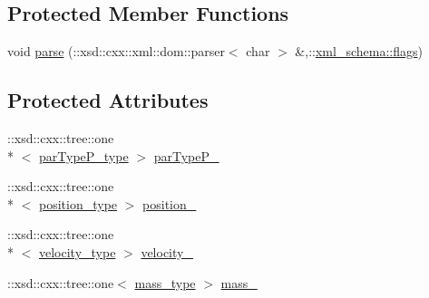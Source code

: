 \subsection*{Protected Member Functions}
\begin{DoxyCompactItemize}
\item 
void \hyperlink{classparticle__t_acb15084033be62d2b49f72496e569497}{parse} (\-::xsd\-::cxx\-::xml\-::dom\-::parser$<$ char $>$ \&,\-::\hyperlink{namespacexml__schema_a0612287d030cb2732d31a45b258fdc87}{xml\-\_\-schema\-::flags})
\end{DoxyCompactItemize}
\subsection*{Protected Attributes}
\begin{DoxyCompactItemize}
\item 
\-::xsd\-::cxx\-::tree\-::one\\*
$<$ \hyperlink{classparticle__t_ab30c5ebbd1c4aabb95799f34942b72b2}{par\-Type\-P\-\_\-type} $>$ \hyperlink{classparticle__t_a766d1a1cbb2d1deb3895f4c86ee5b6d2}{par\-Type\-P\-\_\-}
\item 
\-::xsd\-::cxx\-::tree\-::one\\*
$<$ \hyperlink{classparticle__t_af0130f9c47a13c68332f04389a6f0d2c}{position\-\_\-type} $>$ \hyperlink{classparticle__t_a9617dc13afdc37ecd76d16f2abf14b60}{position\-\_\-}
\item 
\-::xsd\-::cxx\-::tree\-::one\\*
$<$ \hyperlink{classparticle__t_a19095006cf2a2dd955fc026420b38512}{velocity\-\_\-type} $>$ \hyperlink{classparticle__t_a4e8569ca9f6438eca58864d57ce73b39}{velocity\-\_\-}
\item 
\-::xsd\-::cxx\-::tree\-::one$<$ \hyperlink{classparticle__t_a38e9f2cf40d61fa77b19f068d044d294}{mass\-\_\-type} $>$ \hyperlink{classparticle__t_a5c33cbf5a5ac4b4d6ef74cfc19366f77}{mass\-\_\-}
\end{DoxyCompactItemize}


